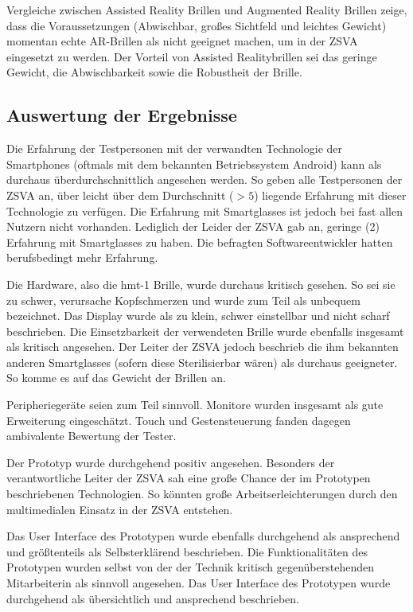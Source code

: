 Vergleiche zwischen Assisted Reality Brillen und Augmented Reality Brillen zeige, dass die Voraussetzungen (Abwischbar, großes Sichtfeld und leichtes Gewicht) momentan echte AR-Brillen als nicht geeignet machen, um in der ZSVA eingesetzt zu werden. Der Vorteil von Assisted Realitybrillen sei das geringe Gewicht, die Abwischbarkeit sowie die Robustheit der Brille.
%
%
%
\subsection{Auswertung der Ergebnisse}
\label{sec:Auswertung_der_Ergebnisse}
%
%
%
Die Erfahrung der Testpersonen mit der verwandten Technologie der Smartphones (oftmals mit dem bekannten Betriebssystem Android) kann als durchaus überdurchschnittlich angesehen werden. So geben alle Testpersonen der ZSVA an, über leicht über dem Durchschnitt ($>5$) liegende Erfahrung mit dieser Technologie zu verfügen. Die Erfahrung mit Smartglasses ist jedoch bei fast allen Nutzern nicht vorhanden. Lediglich der Leider der ZSVA gab an, geringe (2) Erfahrung mit Smartglasses zu haben. Die befragten Softwareentwickler hatten berufsbedingt mehr Erfahrung.

Die Hardware, also die hmt-1 Brille, wurde durchaus kritisch gesehen. So sei sie zu schwer, verursache Kopfschmerzen und wurde zum Teil als unbequem bezeichnet. Das Display wurde als zu klein, schwer einstellbar und nicht scharf beschrieben. Die Einsetzbarkeit der verwendeten Brille wurde ebenfalls insgesamt als kritisch angesehen. Der Leiter der ZSVA jedoch beschrieb die ihm bekannten anderen Smartglasses (sofern diese Sterilisierbar wären) als durchaus geeigneter. So komme es auf das Gewicht der Brillen an. 

Peripheriegeräte seien zum Teil sinnvoll. Monitore wurden insgesamt als gute Erweiterung eingeschätzt. Touch und Gestensteuerung fanden dagegen ambivalente Bewertung der Tester.

Der Prototyp wurde durchgehend positiv angesehen. Besonders der verantwortliche Leiter der ZSVA sah eine große Chance der im Prototypen beschriebenen Technologien. So könnten große Arbeitserleichterungen durch den multimedialen Einsatz in der ZSVA entstehen. 

Das User Interface des Prototypen wurde ebenfalls durchgehend als ansprechend und größtenteils als Selbsterklärend beschrieben. Die Funktionalitäten des Prototypen wurden selbst von der der Technik kritisch gegenüberstehenden Mitarbeiterin als sinnvoll angesehen. Das User Interface des Prototypen wurde durchgehend als übersichtlich und ansprechend beschrieben.

